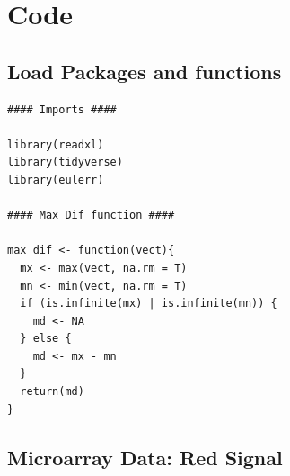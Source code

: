\documentclass[11pt]{article}
\begin{document}
\section{Code}
\label{sec:orgfe97e4f}
\subsection{Load Packages and functions}
\label{sec:org833a6b2}
\begin{verbatim}
#### Imports ####

library(readxl)
library(tidyverse)
library(eulerr)

#### Max Dif function ####

max_dif <- function(vect){
  mx <- max(vect, na.rm = T)
  mn <- min(vect, na.rm = T)
  if (is.infinite(mx) | is.infinite(mn)) {
    md <- NA
  } else {
    md <- mx - mn
  }
  return(md)
}
\end{verbatim}

\subsection{Microarray Data: Red Signal}
\label{sec:org1f8ef1f}
\end{document}
